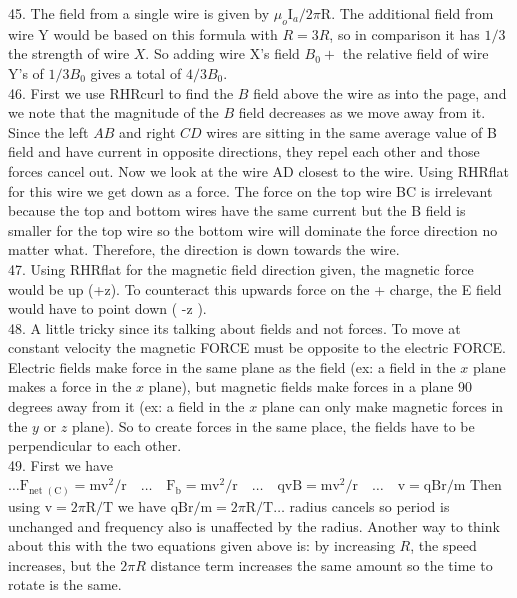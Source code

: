 \begin{enumerate}
45. The field from a single wire is given by $\mu_{o} \mathrm{I}_{a} / 2 \pi \mathrm{R}$. The additional field from wire Y would be based on this formula with $R=3 R$, so in comparison it has $1 / 3$ the strength of wire $X$. So adding wire X's field $B_{0}+$ the relative field of wire Y's of $1 / 3 B_{0}$ gives a total of $4 / 3 B_{0}$.\\
46. First we use RHRcurl to find the $B$ field above the wire as into the page, and we note that the magnitude of the $B$ field decreases as we move away from it. Since the left $A B$ and right $C D$ wires are sitting in the same average value of B field and have current in opposite directions, they repel each other and those forces cancel out. Now we look at the wire AD closest to the wire. Using RHRflat for this wire we get down as a force. The force on the top wire BC is irrelevant because the top and bottom wires have the same current but the B field is smaller for the top wire so the bottom wire will dominate the force direction no matter what. Therefore, the direction is down towards the wire.\\
47. Using RHRflat for the magnetic field direction given, the magnetic force would be up (+z). To counteract this upwards force on the + charge, the E field would have to point down ( -z ).\\
48. A little tricky since its talking about fields and not forces. To move at constant velocity the magnetic FORCE must be opposite to the electric FORCE. Electric fields make force in the same plane as the field (ex: a field in the $x$ plane makes a force in the $x$ plane), but magnetic fields make forces in a plane 90 degrees away from it (ex: a field in the $x$ plane can only make magnetic forces in the $y$ or $z$ plane). So to create forces in the same place, the fields have to be perpendicular to each other.\\
49. First we have $\ldots \mathrm{F}_{\text {net }(\mathrm{C})}=\mathrm{mv}^{2} / \mathrm{r} \quad \ldots \quad \mathrm{F}_{\mathrm{b}}=\mathrm{mv}^{2} / \mathrm{r} \quad \ldots \quad \mathrm{qvB}=\mathrm{mv}^{2} / \mathrm{r} \quad \ldots \quad \mathrm{v}=\mathrm{qBr} / \mathrm{m}$ Then using $\mathrm{v}=2 \pi \mathrm{R} / \mathrm{T}$ we have $\mathrm{qBr} / \mathrm{m}=2 \pi \mathrm{R} / \mathrm{T} \ldots$ radius cancels so period is unchanged and frequency also is unaffected by the radius. Another way to think about this with the two equations given above is: by increasing $R$, the speed increases, but the $2 \pi R$ distance term increases the same amount so the time to rotate is the same.\\

\end{enumerate}
